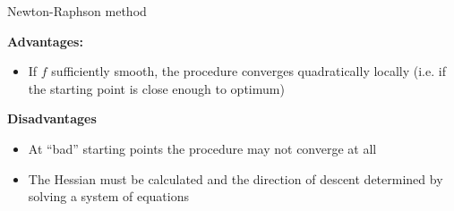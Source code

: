 \documentclass[11pt,compress,t,notes=noshow, xcolor=table]{beamer}
\begin{document}
\begin{vbframe}{Newton-Raphson method}
\framebreak

\textbf{Advantages:}

\begin{itemize}
\item If $f$ sufficiently smooth, the procedure converges quadratically locally (i.e. if the starting point is close enough to optimum)
\end{itemize}

\textbf{Disadvantages}

\begin{itemize}
\item At \enquote{bad} starting points the procedure may not converge at all
\item The Hessian must be calculated and the direction of descent determined by solving a system of equations
\end{itemize}

\end{vbframe}
\end{document}
